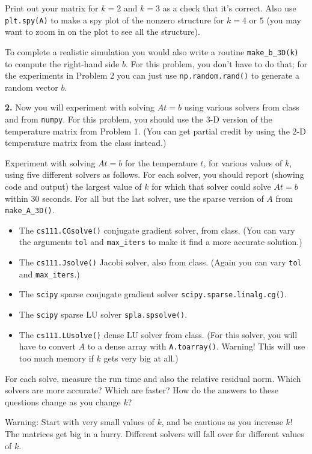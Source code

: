 \documentclass[11pt]{article}
\begin{document}
Print out your matrix for $k=2$ and $k=3$ as a check that it's correct. 
Also use {\tt plt.spy(A)} to make a spy plot of the nonzero structure 
for $k=4$ or $5$ (you may want to zoom in on the plot to see all the structure).

To complete a realistic simulation you would also 
write a routine {\tt make\_b\_3D(k)} to compute the right-hand side $b$.
For this problem, you don't have to do that; 
for the experiments in Problem 2 you can just use {\tt np.random.rand()}
to generate a random vector $b$.

\par\bigskip
{\bf 2.} 
Now you will experiment with solving $At=b$ using various solvers
from class and from {\tt numpy}.
For this problem, you should use the 3-D version of the temperature matrix
from Problem 1. 
(You can get partial credit by using the 2-D temperature matrix from the
class instead.)

Experiment with solving $At=b$ for the temperature $t$, 
for various values of $k$, using five different solvers as follows.
For each solver, you should report (showing code and output) the
largest value of $k$ for which that solver could solve $At=b$ within 30 seconds.
For all but the last solver, use the sparse version of $A$ from {\tt make\_A\_3D()}.
\begin{itemize}
\item The {\tt cs111.CGsolve()} conjugate gradient solver, from class.
(You can vary the arguments {\tt tol} and {\tt max\_iters} to
make it find a more accurate solution.)
\item The {\tt cs111.Jsolve()} Jacobi solver, also from class.
(Again you can vary {\tt tol} and {\tt max\_iters}.)
\item The {\tt scipy} sparse conjugate gradient solver {\tt scipy.sparse.linalg.cg()}.
\item The {\tt scipy} sparse LU solver {\tt spla.spsolve()}.
\item The {\tt cs111.LUsolve()} dense LU solver from class.
(For this solver, you will have to convert $A$ to a dense array with {\tt A.toarray()}. 
Warning! This will use too much memory if $k$ gets very big at all.)
\end{itemize}
For each solve, measure the run time and also the relative residual norm.
Which solvers are more accurate? Which are faster? How do the
answers to these questions change as you change $k$?

Warning: Start with very small values of $k$, and be cautious as you increase $k$!
The matrices get big in a hurry.
Different solvers will fall over for different values of $k$.
\end{document}
